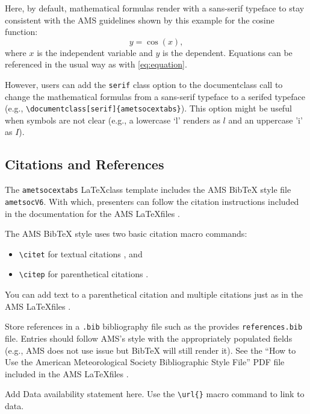 \documentclass[9pt]{ametsocextabs}
\begin{document}
Here, by default, mathematical formulas render with a sans-serif
typeface to stay consistent with the AMS guidelines shown by this
example for the cosine function:
\begin{equation}
    y = \cos (x),
    \label{eq:equation}
\end{equation}
where $x$ is the independent variable and $y$ is the dependent.
Equations can be referenced in the usual way as with \eqref{eq:equation}.

However, users can add the \texttt{serif} class option to the
documentclass call to change the mathematical formulas from a
sans-serif typeface to a serifed typeface (e.g.,
\texttt{\textbackslash documentclass[serif]\{ametsocextabs\}}). This
option might be useful when symbols are not clear (e.g., a lowercase
`l' renders as $l$ and an uppercase 'i' as $I$).

\subsection{Citations and References}
The \lowercase{\texttt{ametsocextabs}} \LaTeX class template
includes the AMS BibTeX style file \texttt{ametsocV6}. With which,
presenters can follow the citation instructions included in the
documentation for the AMS \LaTeX files \cite{AMS2025latex, AMS2025doc}.

The AMS BibTeX style uses two basic citation macro commands:
\begin{itemize}
    \item \texttt{\textbackslash citet} for textual citations \rightarrow \citet{Eliassen1951}, and
    \item \texttt{\textbackslash citep} for parenthetical citations  \rightarrow \citep{Eliassen1951}.
\end{itemize}
You can add text to a parenthetical citation and multiple
citations just as in the AMS \LaTeX files
\citep[e.g.,][]{Eliassen1951,AMS2025latex, AMS2025doc}.

Store references in a \texttt{.bib} bibliography file such as the
provides \texttt{references.bib} file. Entries should follow AMS's
style with the appropriately populated fields (e.g., AMS does not
use issue but BibTeX will still render it). See the ``How to Use the
American Meteorological Society Bibliographic Style File'' PDF file
included in the AMS \LaTeX files \cite{AMS2025latex, AMS2025doc}.

%
\datastatement
Add Data availability statement here. Use the
\texttt{\textbackslash url\{\}} macro command to link to data.
\end{document}
